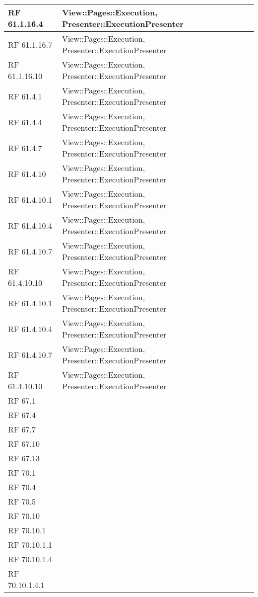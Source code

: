 {\begin{longtable} [c]{| p{3cm} | p{10cm} |}
 \hline 
RF 61.1.16.4 & View::Pages::Execution, Presenter::ExecutionPresenter\\ 
 \hline 
RF 61.1.16.7 & View::Pages::Execution, Presenter::ExecutionPresenter\\ 
 \hline 
RF 61.1.16.10 & View::Pages::Execution, Presenter::ExecutionPresenter\\ 
 \hline 
RF 61.4.1 & View::Pages::Execution, Presenter::ExecutionPresenter\\ 
 \hline 
RF 61.4.4 & View::Pages::Execution, Presenter::ExecutionPresenter\\ 
 \hline 
RF 61.4.7 & View::Pages::Execution, Presenter::ExecutionPresenter\\ 
 \hline 
RF 61.4.10 & View::Pages::Execution, Presenter::ExecutionPresenter\\ 
 \hline 
RF 61.4.10.1 & View::Pages::Execution, Presenter::ExecutionPresenter\\ 
 \hline 
RF 61.4.10.4 & View::Pages::Execution, Presenter::ExecutionPresenter\\ 
 \hline 
RF 61.4.10.7 & View::Pages::Execution, Presenter::ExecutionPresenter\\ 
 \hline 
RF 61.4.10.10 & View::Pages::Execution, Presenter::ExecutionPresenter\\ 
 \hline 
RF 61.4.10.1 & View::Pages::Execution, Presenter::ExecutionPresenter\\ 
 \hline 
RF 61.4.10.4 & View::Pages::Execution, Presenter::ExecutionPresenter\\ 
 \hline 
RF 61.4.10.7 & View::Pages::Execution, Presenter::ExecutionPresenter\\ 
 \hline 
RF 61.4.10.10 & View::Pages::Execution, Presenter::ExecutionPresenter\\ 
 \hline 
RF 67.1 & \\ 
 \hline 
RF 67.4 & \\ 
 \hline 
RF 67.7 & \\ 
 \hline 
RF 67.10 & \\ 
 \hline 
RF 67.13 & \\ 
 \hline 
RF 70.1 & \\ 
 \hline 
RF 70.4 & \\ 
 \hline 
RF 70.5 & \\ 
 \hline 
RF 70.10 & \\ 
 \hline 
RF 70.10.1 & \\ 
 \hline 
RF 70.10.1.1 & \\ 
 \hline 
RF 70.10.1.4 & \\ 
 \hline 
RF 70.10.1.4.1 & \\ 

\end{longtable}}
